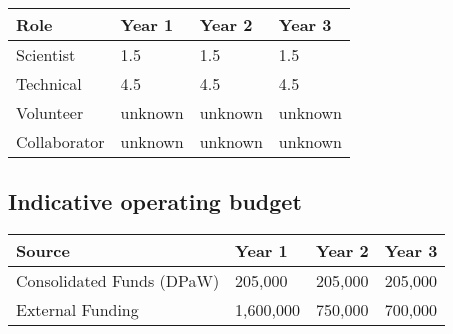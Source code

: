\documentclass[version=last,
    paper=a4,                               %
    10pt,                                   %
    dvipsnames,
    oneside,                              %
    headings=openany,                       %
    open=any,
    BCOR=7mm,                               %
    DIV=15,     %
]{scrbook}
\begin{document}
\begin{longtabu} to \linewidth { |  X | X | X | X | }
\hline
{}
Role & Year 1 & Year 2 & Year 3\\
\hline
\endhead



Scientist & 1.5 & 1.5 & 1.5\\



Technical & 4.5 & 4.5 & 4.5\\



Volunteer & unknown & unknown & unknown\\



Collaborator & unknown & unknown & unknown\\


\hline
\end{longtabu}



\subsection*{Indicative operating budget }



\begin{longtabu} to \linewidth { |  X | X | X | X | }
\hline
{}
Source & Year 1 & Year 2 & Year 3\\
\hline
\endhead



Consolidated Funds (DPaW) & 205,000 & 205,000 & 205,000\\



External Funding & 1,600,000 & 750,000 & 700,000\\


\hline
\end{longtabu}






\end{document}
